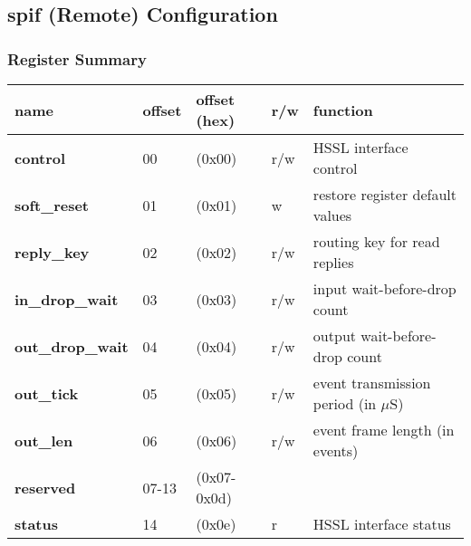 \documentclass[11pt,a4paper,twoside]{article}
\begin{document}
\clearpage
\subsection{spif (Remote) Configuration}


\subsubsection*{Register Summary}

\begin{center}
\begin{table}[!h]
	\begin{tabularx}{\textwidth}{| p{37mm} p{13mm} p{21mm} p{6mm} X |}
		\hline
		\textbf{name}                        & \textbf{offset}            & \textbf{offset} (hex)          & \textbf{r/w}        & \textbf{function} \\%
		\hline
		\hline
		\textbf{control}                     & 00                         & (0x00)                         & r/w                 & HSSL interface control \\%
		\textbf{soft\_reset}                 & 01                         & (0x01)                         & w                   & restore register default values\\%
		\textbf{reply\_key}                  & 02                         & (0x02)                         & r/w                 & routing key for read replies \\%
		\textbf{in\_drop\_wait}              & 03                         & (0x03)                         & r/w                 & input wait-before-drop count \\%
		\textbf{out\_drop\_wait}             & 04                         & (0x04)                         & r/w                 & output wait-before-drop count \\%
		\textbf{out\_tick}                   & 05                         & (0x05)                         & r/w                 & event transmission period (in $\mu$S)\\%
		\textbf{out\_len}                    & 06                         & (0x06)                         & r/w                 & event frame length (in events) \\%
		\cellcolor{gray!25}\textbf{reserved} & \cellcolor{gray!25}07-13   & \cellcolor{gray!25}(0x07-0x0d) & \cellcolor{gray!25} & \cellcolor{gray!25}\\%
		\textbf{status}                      & 14                         & (0x0e)                         & r                   & HSSL interface status \\%

\end{tabularx}
\end{table}
\end{center}
\end{document}
